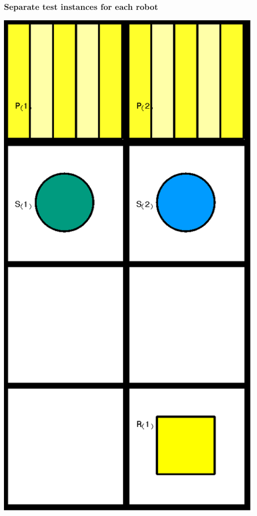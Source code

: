 \documentclass{beamer}
\begin{document}
\begin{frame}
\frametitle{Separate test instances for each robot}
\centering
\includegraphics[scale=0.2]{x3y2r1s2p2_1.png}

\end{frame}
\end{document}
